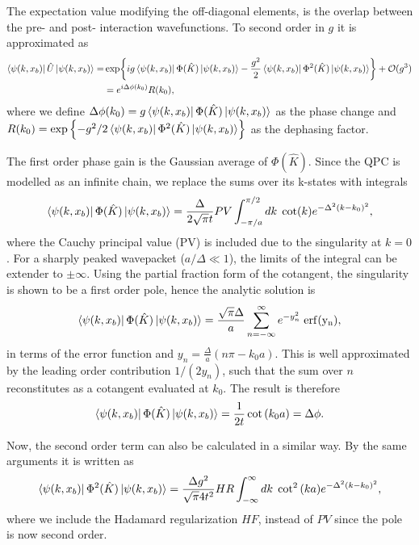 \documentclass[10pt,
 amsmath,amssymb,
 aps,prb, twocolumn
]{revtex4-2}
\begin{document}
 The expectation value modifying the off-diagonal elements, is the overlap between the pre- and post- interaction wavefunctions. To second order in $g$ it is approximated as 
\begin{align}
    \bra{\psi(k,x_b)}\hat{U}\ket{\psi(k,x_b)} = & \exp{i g \bra{\psi(k,x_b)} \Phi(\hat{K})\ket{\psi(k,x_b)} - \frac{g^2}{2} \bra{\psi(k,x_b)} \Phi^2(\hat{K})\ket{\psi(k,x_b)} } + \mathcal{O}(g^3) \nonumber \\
    & = e^{i \Delta \phi (k_0)} R(k_0),
\end{align}
where we define \mbox{$\Delta \phi (k_0) =  g \bra{\psi(k,x_b)} \Phi(\hat{K})\ket{\psi(k,x_b)}$} as the phase change and \mbox{$R(k_0) = \exp\left\{-g^2/2 \bra{\psi(k,x_b)} \Phi^2(\hat{K})\ket{\psi(k,x_b)}\right\}$} as the dephasing factor.

The first order phase gain is the Gaussian average of \mbox{$\Phi(\hat{K})$}. Since the QPC is modelled as an infinite chain, we replace the sums over its k-states with integrals
\begin{align}
    \bra{\psi(k,x_b)} \Phi(\hat{K})\ket{\psi(k,x_b)} = \frac{\Delta}{2\sqrt{\pi}t} P V\int_{-\pi/a}^{\pi/2} dk \;\cot(k) e^{-\Delta^2 (k-k_0)^2},
\end{align}
where the Cauchy principal value (PV) is included due to the singularity at $k=0$. For a sharply peaked wavepacket (\mbox{$a/\Delta \ll 1$}), the limits of the integral can be extender to $\pm \infty$. Using the partial fraction form of the cotangent, the singularity is shown to be a first order pole, hence the analytic solution is
\begin{align}
    \bra{\psi(k,x_b)} \Phi(\hat{K})\ket{\psi(k,x_b)} = \frac{\sqrt{\pi}\Delta}{a}\sum_{n=-\infty}^\infty e^{-y_n^2} \; \rm{erf}(y_n),
\end{align}
in terms of the error function and \mbox{$y_n = \frac{\Delta}{a}(n\pi-k_0a)$}. This is well approximated by the leading order contribution \mbox{$1/(2y_n)$}, such that the sum over $n$ reconstitutes as a cotangent evaluated at $k_0$. The result is therefore
\begin{align}
    \bra{\psi(k,x_b)} \Phi(\hat{K})\ket{\psi(k,x_b)} = \frac{1}{2t}\cot{(k_0a)} = \Delta \phi.
\end{align}

Now, the second order term can also be calculated in a similar way. By the same arguments it is written as
\begin{align}
    \bra{\psi(k,x_b)} \Phi^2(\hat{K})\ket{\psi(k,x_b)} =\frac{\Delta g^2}{\sqrt{\pi}4t^2} HR \int_{-\infty}^{\infty} dk\; \cot^2{(ka)}e^{-\Delta^2 (k-k_0)^2},
\end{align}
where we include the Hadamard regularization $HF$, instead of $PV$ since the pole is now second order.
\end{document}
